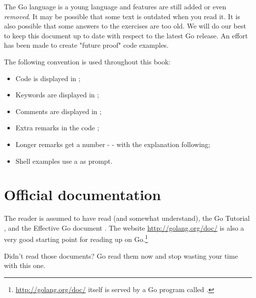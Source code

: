 \begin{lbar}
The Go language is a young language and
features are still added or even \emph{removed}. It 
may be possible that some text is outdated when you
read it. It is also
possible that some answers to the exercises are
too old. We will do our best to keep this document up to 
date with respect to the latest Go release.
An effort has been made to create "future proof" code examples.
\end{lbar}
The following convention is used throughout this book:
\begin{itemize}
\item Code is displayed in ;
\item Keywords are displayed in ;
\item Comments are displayed in ;
\item Extra remarks in the code ;
\item Longer remarks get a number -  - with the explanation following;
\item Shell examples use a \pr{} as prompt.
\end{itemize}

\section{Official documentation}
The reader is assumed to have read (and somewhat understand), the
Go Tutorial \cite{go_tutorial}, and the Effective Go
document \cite{effective_go}. The
website \url{http://golang.org/doc/} is also a very good starting point
for reading up on Go.\footnote{\url{http://golang.org/doc/} itself is served by 
a Go program called .}

\begin{lbar}
Didn't read those documents? Go read them now and stop wasting your time
with this one.
\end{lbar}

